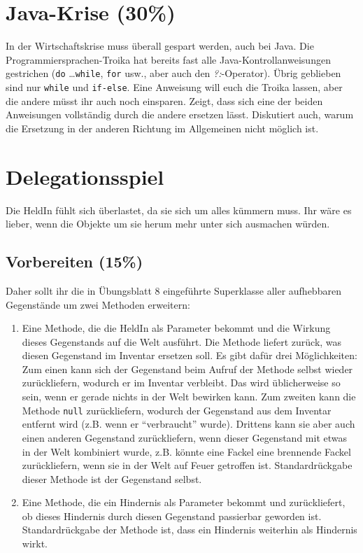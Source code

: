 \documentclass{../pi-aufgabenblatt}
\begin{document}

\section{Java-Krise (30\%)}

In der Wirtschaftskrise muss überall gespart werden, auch bei Java. Die Programmiersprachen-Troika hat bereits fast alle Java-Kontrollanweisungen gestrichen (\texttt{do} \ldots \texttt{while}, \texttt{for} usw., aber auch den \emph{?:}-Operator). Übrig geblieben sind nur \texttt{while} und \texttt{if-else}. Eine Anweisung will euch die Troika lassen, aber die andere müsst ihr auch noch einsparen. Zeigt, dass sich eine der beiden Anweisungen vollständig durch die andere ersetzen lässt. Diskutiert auch, warum die Ersetzung in der anderen Richtung im Allgemeinen nicht möglich ist.

\section{Delegationsspiel}

Die HeldIn fühlt sich überlastet, da sie sich um alles kümmern muss. Ihr wäre es lieber, wenn die Objekte um sie herum mehr unter sich ausmachen würden. 

\subsection{Vorbereiten (15\%)}
\label{s:erweitern}

Daher sollt ihr die in Übungsblatt 8 eingeführte Superklasse aller aufhebbaren Gegenstände um zwei Methoden erweitern:

\begin{enumerate}

\item Eine Methode, die die HeldIn als Parameter bekommt und die Wirkung dieses Gegenstands auf die Welt ausführt. Die Methode liefert zurück, was diesen Gegenstand im Inventar ersetzen soll. Es gibt dafür drei Möglichkeiten: Zum einen kann sich der Gegenstand beim Aufruf der Methode selbst wieder zurückliefern, wodurch er im Inventar verbleibt. Das wird üblicherweise so sein, wenn er gerade nichts in der Welt bewirken kann. Zum zweiten kann die Methode \texttt{null} zurückliefern, wodurch der Gegenstand aus dem Inventar entfernt wird (z.B. wenn er "`verbraucht"' wurde). Drittens kann sie aber auch einen anderen Gegenstand zurückliefern, wenn dieser Gegenstand mit etwas in der Welt kombiniert wurde, z.B. könnte eine Fackel eine brennende Fackel zurückliefern, wenn sie in der Welt auf Feuer getroffen ist. Standardrückgabe dieser Methode ist der Gegenstand selbst.

\item Eine Methode, die ein Hindernis als Parameter bekommt und zurückliefert, ob dieses Hindernis durch diesen Gegenstand passierbar geworden ist. Standardrückgabe der Methode ist, dass ein Hindernis weiterhin als Hindernis wirkt.

\end{enumerate}
\end{document}
